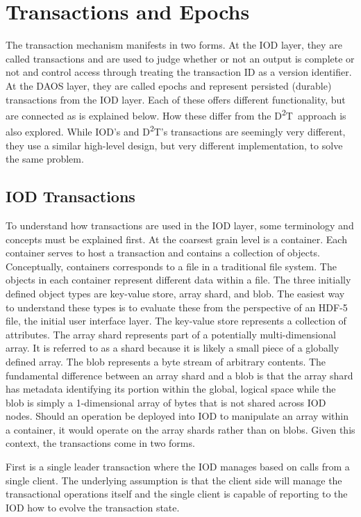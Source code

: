 \documentclass[conference]{sig-alt-gov2}
\newcommand{\DDT}{D\textsuperscript{2}T~}
\newcommand{\DDTns}{D\textsuperscript{2}T}
\begin{document}
\section{Transactions and Epochs}
\label{sec:transactions}

The transaction mechanism manifests in two forms. At the IOD layer, they are
called transactions and are used to judge whether or not an output is complete
or not and control access through treating the transaction ID as a version
identifier. At the DAOS layer, they are called epochs and represent persisted
(durable) transactions from the IOD layer. Each of these offers different
functionality, but are connected as is explained below. How these differ from
the \DDT approach is also explored. While IOD's and \DDTns's transactions are
seemingly very different, they use a similar high-level design, but very
different implementation, to solve the same problem.

\subsection{IOD Transactions}
To understand how transactions are used in the IOD layer, some terminology and
concepts must be explained first. At the coarsest grain level is a container.
Each container serves to host a transaction and contains a collection of
objects. Conceptually, containers corresponds to a file in a traditional file
system. The objects in each container represent different data within a file.
The three initially defined object types are key-value store, array shard,
and blob. The easiest way to understand these types is to evaluate these from
the perspective of an HDF-5 file, the initial user interface layer. The
key-value store represents a collection of attributes. The array shard
represents part of a potentially multi-dimensional array. It is referred to as
a shard because it is likely a small piece of a globally defined array. The
blob represents a byte stream of arbitrary contents.  The fundamental
difference between an array shard and a blob is that the array shard has
metadata identifying its portion within the global, logical space while the
blob is simply a 1-dimensional array of bytes that is not shared across IOD
nodes.  Should an operation be deployed into IOD to manipulate an array within
a container, it would operate on the array shards rather than on blobs. Given
this context, the transactions come in two forms.

First is a single leader transaction where the IOD manages based on calls from
a single client. The underlying assumption is that the client side will manage
the transactional operations itself and the single client is capable of
reporting to the IOD how to evolve the transaction state. 
\end{document}
